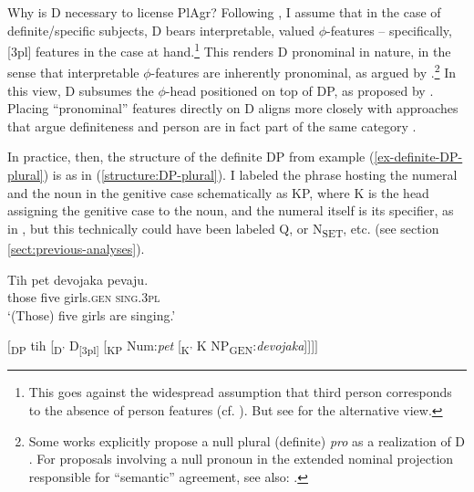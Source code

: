 \documentclass[output=paper,colorlinks,citecolor=brown
]{langscibook}
\begin{document}
Why is D necessary to license PlAgr? Following \citet{Pereltsvaig2006}, I assume that in the case of definite/specific subjects, D bears interpretable, valued $\phi$-features -- specifically, [3pl] features in the case at hand.\footnote{This goes against the widespread assumption that third person corresponds to the absence of person features (cf. \citealt{benveniste1966, DenDikken2019}). But see \citet{Ackema2018, Grishin2023, Alexiadou2024} for the alternative view.} This renders D pronominal in nature, in the sense that interpretable $\phi$-features are inherently pronominal, as argued by \citet{sauerland2004}.\footnote{Some works explicitly propose a null plural (definite) \textit{pro} as a realization of D \citep{DenDikken2001, mitic-arsenijevic-2019}. For proposals involving a null pronoun in the extended nominal projection responsible for “semantic” agreement, see also: \citet{Postal1966, Citko2004, Taylor2009, Costa2013, TorregoLaka2015, Polinsky2016, Arsenijevic2016pluringulars, Camacho2021}.} In this view, D subsumes the $\phi$-head positioned on top of DP, as proposed by \citet{sauerland2004}. Placing ``pronominal” features directly on D aligns more closely with approaches that argue definiteness and person are in fact part of the same category \citep{Lyions1999, Stankovic2016, Milosavljevic2017, Milosavljevic2018MS}.


In practice, then, the structure of the definite DP from example (\ref{ex-definite-DP-plural}) is as in (\ref{structure:DP-plural}). I labeled the phrase hosting the numeral and the noun in the genitive case schematically as KP, where K is the head assigning the genitive case to the noun, and the numeral itself is its specifier, as in \citet{Driemel2019}, but this technically could have been labeled Q, or N\textsubscript{SET}, etc. (see section \ref{sect:previous-analyses}). 

 \ea \label{ex-definite-DP-plural}
 \gll Tih pet devojaka pevaju. \\
those five girls.\textsc{gen} \textsc{sing.3pl} \\
\glt `(Those) five girls are singing.'
\z

\ea \label{structure:DP-plural}
$[$\textsubscript{DP} tih [\textsubscript{D'} D\textsubscript{[3pl]} [\textsubscript{KP} Num:\textit{pet} [\textsubscript{K'} K NP\textsubscript{GEN}:\textit{devojaka}]]]$]$
\z 
\end{document}
